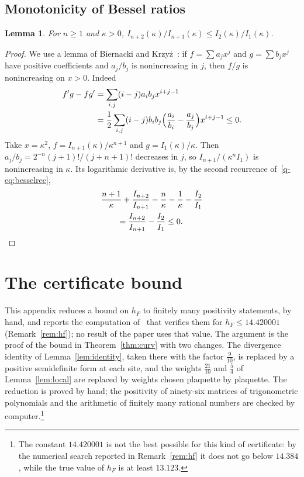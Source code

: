 \documentclass[aps,prd,twocolumn,superscriptaddress,nofootinbib,longbibliography,floatfix,amsmath,amssymb,10pt]{revtex4-2}
\newtheorem{lemma}[theorem]{Lemma}
\theoremstyle{definition}
\theoremstyle{remark}
\begin{document}
\subsection{Monotonicity of Bessel ratios}

\begin{lemma}\label{q-lem:ratio}
For $n\ge1$ and $\kappa>0$, $I_{n+2}(\kappa)/I_{n+1}(\kappa)\le I_2(\kappa)/
I_1(\kappa)$.
\end{lemma}

\begin{proof}
We use a lemma of Biernacki and Krzy\.z~\cite{BK55}: if $f=\sum a_jx^j$ and
$g=\sum b_jx^j$ have positive coefficients and $a_j/b_j$ is nonincreasing in
$j$, then $f/g$ is nonincreasing on $x>0$. Indeed
\[
\begin{aligned}
f'g-fg'&=\sum_{i,j}(i-j)a_ib_jx^{i+j-1}\\
&=\frac12\sum_{i,j}(i-j)b_ib_j\Bigl(\frac{a_i}{b_i}-\frac{a_j}{b_j}\Bigr)
x^{i+j-1}\le0 .
\end{aligned}
\]
Take $x=\kappa^2$, $f=I_{n+1}(\kappa)/\kappa^{n+1}$ and $g=I_1(\kappa)/\kappa$.
Then $a_j/b_j=2^{-n}(j+1)!/(j+n+1)!$ decreases in $j$, so $I_{n+1}/(\kappa^n
I_1)$ is nonincreasing in $\kappa$. Its logarithmic derivative is, by the
second recurrence of~\eqref{q-eq:besselrec},
\[
\begin{aligned}
&\frac{n+1}\kappa+\frac{I_{n+2}}{I_{n+1}}-\frac n\kappa-\frac1\kappa-\frac{I_2}
{I_1}\\
&\qquad=\frac{I_{n+2}}{I_{n+1}}-\frac{I_2}{I_1}\le0 .
\end{aligned}\qedhere
\]
\end{proof}

\section{The certificate bound}\label{app:certificate}

This appendix reduces a bound on $h_F$ to finitely many positivity
statements, by hand, and reports the computation of~\cite{Rom26} that
verifies them for $h_F\le14.420001$ (Remark~\ref{rem:hf}); no result of
the paper uses that value. The argument is the proof of the bound in
Theorem~\ref{thm:curv} with two changes. The divergence identity of
Lemma~\ref{lem:identity}, taken there with the factor $\frac9{10}$, is
replaced by a positive semidefinite form at each site, and the weights
$\frac{21}{10}$ and $\frac54$ of Lemma~\ref{lem:local} are replaced by
weights chosen plaquette by plaquette. The reduction is proved by hand;
the positivity of ninety-six matrices of trigonometric polynomials and the
arithmetic of finitely many rational numbers are checked by
computer.\footnote{The constant
$14.420001$ is not the best possible for this kind of certificate: by the
numerical search reported in Remark~\ref{rem:hf} it does not go below $14.384$, while
the true value of $h_F$ is at least $13.123$.}
\end{document}
